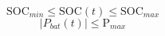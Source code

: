 \begin{equation}
\text{SOC}_{min} \leq \text{SOC}(t) \leq \text{SOC}_{max}
\label{equ-SoC-range}
\end{equation}
\begin{equation}
\left|P_{bat}(t)\right| \leq \text{P}_{max}
\label{equ-charge-discharge-range}
\end{equation}